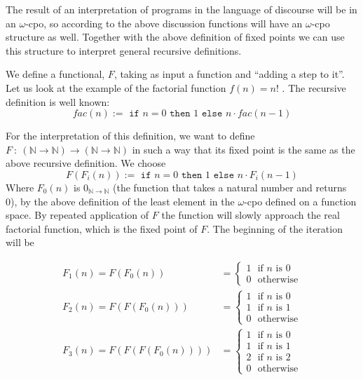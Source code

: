 \documentclass[11pt, leqno, titlepage]{article}
\theoremstyle{definition}
\begin{document}
The result of an interpretation of programs in the language of discourse will be in
an $\omega$-cpo, so according to the above discussion functions will have an
$\omega$-cpo structure as well. Together with the above definition of fixed points we
can use this structure to interpret general recursive definitions. 

We define a functional, $F$, taking as input a function and ``adding a step to it''.
Let us look at the example of the factorial function $f(n) = n!$ \cite{haskell}.
The recursive definition is well known:
$$fac(n) := \texttt{ if } n = 0 \texttt{ then }1\texttt{ else } n\cdot fac(n-1)$$

For the interpretation of this definition, we want to define $F~:~(\mathbb{N} \to
\mathbb{N}) \to (\mathbb{N} \to \mathbb{N})$ in such a way that its fixed point is
the same as the above recursive definition. We choose
$$F(F_i(n)):=\texttt{ if }n=0\texttt{ then }1\texttt{ else }n\cdot F_i(n-1)$$
Where $F_0(n)$ is $0_{\mathbb{N} \to \mathbb{N}}$ (the function that takes a natural
number and returns 0), by the above definition of the least element in the
$\omega$-cpo defined on a function space. By repeated application of $F$ the function
will slowly approach the real factorial function, which is the fixed point of $F$.
The beginning of the iteration will be

\begin{align*}
  F_1(n) = F(F_0(n)) & = \begin{cases}
                           1~~~\text{if }n\text{ is 0}\\
                           0~~~\text{otherwise}
                         \end{cases}
  \\
  F_2(n) = F(F(F_0(n))) & = \begin{cases}
                             1~~~\text{if }n\text{ is 0}\\
                             1~~~\text{if }n\text{ is 1}\\
                             0~~~\text{otherwise}
                           \end{cases}
  \\
  F_3(n) = F(F(F(F_0(n)))) & = \begin{cases}
                                1~~~\text{if }n\text{ is 0}\\
                                1~~~\text{if }n\text{ is 1}\\
                                2~~~\text{if }n\text{ is 2}\\
                                0~~~\text{otherwise}
                              \end{cases}
\end{align*}
\end{document}
